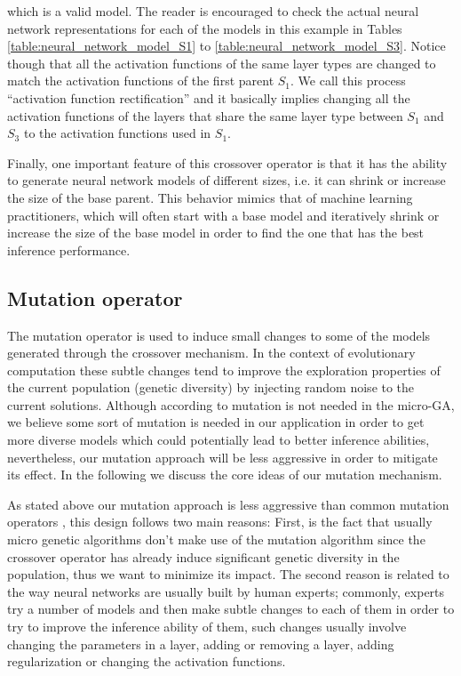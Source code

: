\documentclass[journal]{IEEEtran}
\begin{document}
which is a valid model. The reader is encouraged to check the actual neural network representations for each of the models in this example in Tables \ref{table:neural_network_model_S1} to \ref{table:neural_network_model_S3}. Notice though that all the activation functions of the same layer types are changed to match the activation functions of the first parent $S_1$. We call this process ``activation function rectification'' and it basically implies changing all the activation functions of the layers that share the same layer type between $S_1$ and $S_3$ to the activation functions used in $S_1$. 

Finally, one important feature of this crossover operator is that it has the ability to generate neural network models of different sizes, i.e. it can shrink or increase the size of the base parent. This behavior mimics that of machine learning practitioners, which will often start with a base model and iteratively shrink or increase the size of the base model in order to find the one that has the best inference performance.

\subsection{Mutation operator}
\label{sec:mutation}

The mutation operator is used to induce small changes to some of the models generated through the crossover mechanism. In the context of evolutionary computation these subtle changes tend to improve the exploration properties of the current population (genetic diversity) by injecting random noise to the current solutions.  Although according to \cite{Krishnakumar1989} mutation is not needed in the micro-GA, we believe some sort of mutation is needed in our application in order to get more diverse models which could potentially lead to better inference abilities, nevertheless, our mutation approach will be less aggressive in order to mitigate its effect. In the following we discuss the core ideas of our mutation mechanism.

As stated above our mutation approach is less aggressive than common mutation operators \cite{Engelbrecht2007}, this design follows two main reasons: First, is the fact that usually micro genetic algorithms don't make use of the mutation algorithm since the crossover operator has already induce significant genetic diversity in the population, thus we want to minimize its impact. The second reason is related to the way neural networks are usually built by human experts; commonly, experts try a number of models and then make subtle changes to each of them in order to try to improve the inference ability of them, such changes usually involve changing the parameters in a layer, adding or removing a layer, adding regularization or changing the activation functions. 
\end{document}
